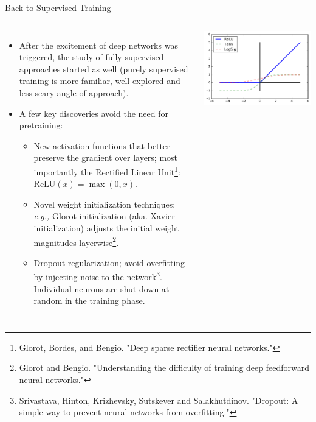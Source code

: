 \documentclass[10pt, aspectratio=169]{beamer} %
\begin{document}
\begin{frame}[fragile,allowframebreaks=0.8]{Back to Supervised Training}
\begin{columns}[onlytextwidth]
	\begin{itemize}
		\item After the excitement of deep networks was triggered, the study of fully
		supervised approaches started as well (purely supervised training is more familiar,
		well explored and less scary angle of approach).
		\item A few key discoveries avoid the need for pretraining:
		\begin{itemize}
			\item New activation functions that better preserve the gradient over layers; most importantly the
			Rectified Linear Unit\footnote{\tiny Glorot, Bordes, and Bengio. "Deep sparse rectifier neural networks."}: $\text{ReLU}(x) = \max(0, x)$.
			\item Novel weight initialization techniques; \emph{e.g.,} Glorot initialization (aka. Xavier initialization) adjusts the initial weight magnitudes layerwise\footnote{\tiny Glorot and Bengio. "Understanding the difficulty of training deep feedforward neural networks."}.
			\item Dropout regularization; avoid overfitting by injecting noise to the network\footnote{\tiny Srivastava, Hinton, Krizhevsky, Sutskever and Salakhutdinov. "Dropout: A simple way to prevent neural networks from overfitting."}. Individual neurons are shut down at random in the training phase.
		\end{itemize}
		\end{itemize}
\hspace*{-2cm}\includegraphics[width=\columnwidth]{images/relu.pdf}
\end{columns}
\end{frame}
\end{document}
